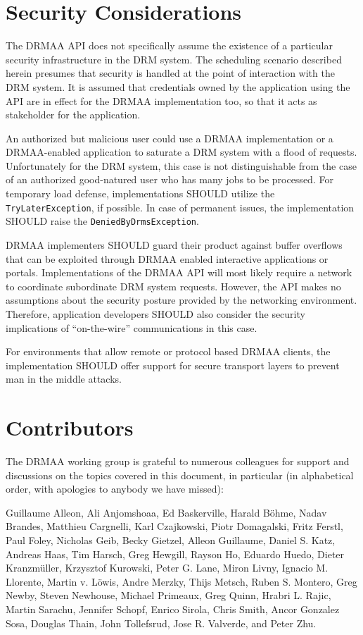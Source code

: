 \documentclass{article}
\newcommand{\h}[1]{\lstinline|#1|}
\begin{document}
\section{Security Considerations}
\label{sec:security}

The DRMAA API does not specifically assume the existence of a particular security infrastructure in the DRM system. The scheduling scenario described herein presumes that security is handled at the point of interaction with the DRM system. It is assumed that credentials owned by the application using the API are in effect for the DRMAA implementation too, so that it acts as stakeholder for the application. 

An authorized but malicious user could use a DRMAA implementation or a DRMAA-enabled application to saturate a DRM system with a flood of requests. Unfortunately for the DRM system, this case is not distinguishable from the case of an authorized good-natured user who has many jobs to be processed. For temporary load defense, implementations SHOULD utilize the \h{TryLaterException}, if possible. In case of permanent issues, the implementation SHOULD raise the \h{DeniedByDrmsException}.

DRMAA implementers SHOULD guard their product against buffer overflows that can be exploited through DRMAA enabled interactive applications or portals. Implementations of the DRMAA API will most likely require a network to coordinate subordinate DRM system requests. However, the API makes no assumptions about the security posture provided by the networking environment. Therefore, application developers SHOULD also consider the security implications of \enquote{on-the-wire} communications in this case.

For environments that allow remote or protocol based DRMAA clients, the implementation SHOULD offer support for secure transport layers to prevent man in the middle attacks. 

\section{Contributors}


The DRMAA working group is grateful to numerous colleagues for support and discussions on the topics covered in this document, in particular (in alphabetical order, with apologies to anybody we have missed): 

Guillaume Alleon, 
Ali Anjomshoaa, 
Ed Baskerville, 
Harald Böhme, 
Nadav Brandes,
Matthieu Cargnelli, 
Karl Czajkowski, 
Piotr Domagalski, 
Fritz Ferstl, 
Paul Foley, 
Nicholas Geib, 
Becky Gietzel, 
Alleon Guillaume, 
Daniel S. Katz,
Andreas Haas,
Tim Harsch, 
Greg Hewgill, 
Rayson Ho, 
Eduardo Huedo, 
Dieter Kranzmüller, 
Krzysztof Kurowski, 
Peter G. Lane, 
Miron Livny, 
Ignacio M. Llorente, 
Martin v. Löwis, 
Andre Merzky, 
Thijs Metsch,
Ruben S. Montero, 
Greg Newby, 
Steven Newhouse, 
Michael Primeaux, 
Greg Quinn, 
Hrabri L. Rajic,
Martin Sarachu, 
Jennifer Schopf, 
Enrico Sirola, 
Chris Smith, 
Ancor Gonzalez Sosa, 
Douglas Thain, 
John Tollefsrud, 
Jose R. Valverde, 
and Peter Zhu.
\end{document}
